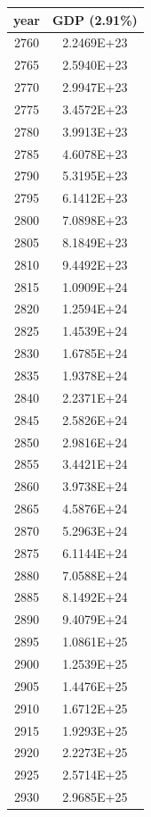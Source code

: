 \documentclass[a4paper]{article}
\begin{document}
	\begin{tabular}{|c|c|}
		\hline
		year & GDP (2.91\%) \\
		\hline
		2760 & 2.2469E+23 \\
		\hline
		2765 & 2.5940E+23 \\
		\hline
		2770 & 2.9947E+23 \\
		\hline
		2775 & 3.4572E+23 \\
		\hline
		2780 & 3.9913E+23 \\
		\hline
		2785 & 4.6078E+23 \\
		\hline
		2790 & 5.3195E+23 \\
		\hline
		2795 & 6.1412E+23 \\
		\hline
		2800 & 7.0898E+23 \\
		\hline
		2805 & 8.1849E+23 \\
		\hline
		2810 & 9.4492E+23 \\
		\hline
		2815 & 1.0909E+24 \\
		\hline
		2820 & 1.2594E+24 \\
		\hline
		2825 & 1.4539E+24 \\
		\hline
		2830 & 1.6785E+24 \\
		\hline
		2835 & 1.9378E+24 \\
		\hline
		2840 & 2.2371E+24 \\
		\hline
		2845 & 2.5826E+24 \\
		\hline
		2850 & 2.9816E+24 \\
		\hline
		2855 & 3.4421E+24 \\
		\hline
		2860 & 3.9738E+24 \\
		\hline
		2865 & 4.5876E+24 \\
		\hline
		2870 & 5.2963E+24 \\
		\hline
		2875 & 6.1144E+24 \\
		\hline
		2880 & 7.0588E+24 \\
		\hline
		2885 & 8.1492E+24 \\
		\hline
		2890 & 9.4079E+24 \\
		\hline
		2895 & 1.0861E+25 \\
		\hline
		2900 & 1.2539E+25 \\
		\hline
		2905 & 1.4476E+25 \\
		\hline
		2910 & 1.6712E+25 \\
		\hline
		2915 & 1.9293E+25 \\
		\hline
		2920 & 2.2273E+25 \\
		\hline
		2925 & 2.5714E+25 \\
		\hline
		2930 & 2.9685E+25 \\

\end{tabular}
\end{document}
